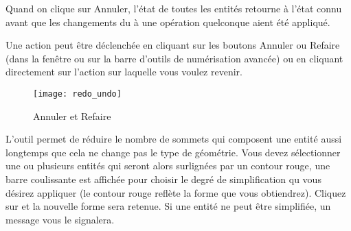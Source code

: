 \begin{itemize}
Quand on clique sur Annuler, l'état de toutes les entités retourne à l'état connu avant que les changements du à une opération quelconque aient été appliqué.

Une action peut être déclenchée en cliquant sur les boutons Annuler ou Refaire (dans la fenêtre ou sur la barre d'outils de numérisation avancée) ou en cliquant directement sur l'action sur laquelle vous voulez revenir.

\begin{figure}[ht]
   \begin{center}
   \caption{Annuler et Refaire \nixcaption}\label{fig:vector_redoundo}\smallskip
   \texttt{[image: redo\_undo]}
\end{center}
\end{figure}


L'outil  permet de réduire le nombre de sommets qui composent une entité aussi longtemps que cela ne change pas le type de géométrie. Vous devez sélectionner une ou plusieurs entités qui seront alors surlignées par un contour rouge, une barre coulissante est affichée pour choisir le degré de simplification qu vous désirez appliquer (le contour rouge reflète la forme que vous obtiendrez). Cliquez sur  et la nouvelle forme sera retenue. Si une entité ne peut être simplifiée, un message vous le signalera.




\end{itemize}

